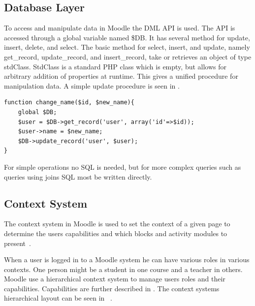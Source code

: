 \subsection{Database Layer}
\label{sec:moodleoplatformdbml}
To access and manipulate data in Moodle the DML API is used.  The API is accessed through a global variable named \$DB. It has several method for update, insert, delete, and select. 
The basic method for select, insert, and update, namely get\_record, update\_record, and insert\_record, take or retrieves an object of type stdClass. StdClass is a standard PHP class which is empty, but allows for arbitrary addition of properties at runtime. This gives a unified procedure for manipulation data. A simple update procedure is seen in .
\begin{lstlisting}[style=phpCode, caption=\myCaption{Example of how to change the name of an user}, label=moodlecodeupdate]
function change_name($id, $new_name){
	global $DB;
	$user = $DB->get_record('user', array('id'=>$id));
	$user->name = $new_name;
	$DB->update_record('user', $user);
}
\end{lstlisting}
For simple operations no SQL is needed, but for more complex queries such as queries using joins SQL most be written directly. 



\subsection{Context System}
\label{sub:contextsystem}
The context system in Moodle is used to set the context of a given page to determine the users capabilities and which blocks and activity modules to present~\cite{moodlerolesandmodules}.
 
When a user is logged in to a Moodle system he can have various roles in various contexts. 
One person might be a student in one course and a teacher in others. 
Moodle use a hierarchical context system to manage users roles and their capabilities. 
Capabilities are further described in . 
The context systems hierarchical layout can be seen in ~\cite{moodlefilemoodlecontext}.
 
